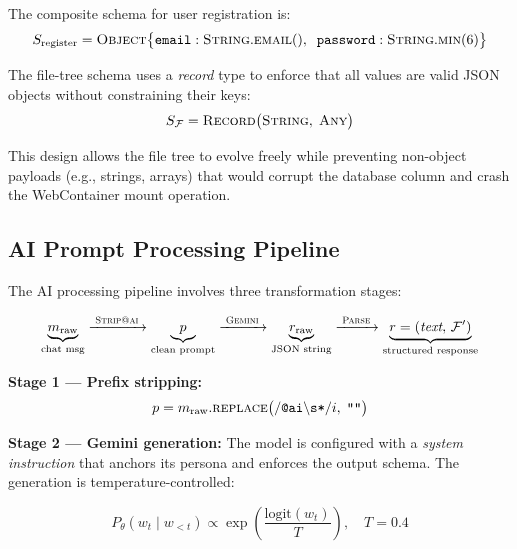 The composite schema for user registration is:
\begin{equation}
  S_{\text{register}} = \textsc{Object}\bigl\{
    \texttt{email}: \textsc{String}.\textsc{email}(),\;\;
    \texttt{password}: \textsc{String}.\textsc{min}(6)
  \bigr\}
  \label{eq:register_schema}
\end{equation}

The file-tree schema uses a \emph{record} type to enforce that all values
are valid JSON objects without constraining their keys:
\begin{equation}
  S_{\mathcal{F}} = \textsc{Record}\bigl(\textsc{String},\; \textsc{Any}\bigr)
  \label{eq:filetree_schema}
\end{equation}

This design allows the file tree to evolve freely while preventing
non-object payloads (e.g., strings, arrays) that would corrupt the
database column and crash the WebContainer mount operation.

\subsection{AI Prompt Processing Pipeline}
\label{sub:ai_method}

The AI processing pipeline involves three transformation stages:

\begin{equation}
  \underbrace{m_{\text{raw}}}_{\text{chat msg}}
  \xrightarrow{\;\textsc{Strip@ai}\;}
  \underbrace{p}_{\text{clean prompt}}
  \xrightarrow{\;\textsc{Gemini}\;}
  \underbrace{r_{\text{raw}}}_{\text{JSON string}}
  \xrightarrow{\;\textsc{Parse}\;}
  \underbrace{r = (\textit{text},\, \mathcal{F}')}_{\text{structured response}}
  \label{eq:pipeline}
\end{equation}

\noindent \textbf{Stage 1 --- Prefix stripping:}
\[
  p = m_{\text{raw}}.\textsc{replace}\bigl(/\texttt{@ai}\backslash\texttt{s*}/i,\; \texttt{""}\bigr)
\]

\noindent \textbf{Stage 2 --- Gemini generation:}
The model is configured with a \emph{system instruction} that anchors its
persona and enforces the output schema. The generation is temperature-controlled:

\begin{equation}
  P_\theta(w_t \mid w_{<t}) \propto \exp\!\left(\frac{\text{logit}(w_t)}{T}\right),
  \quad T = 0.4
  \label{eq:temperature}
\end{equation}

